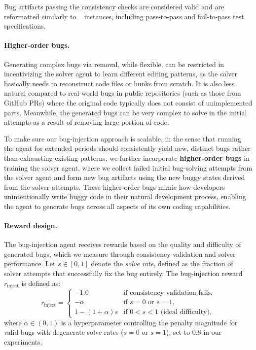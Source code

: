 Bug artifacts passing the consistency checks are considered valid and are reformatted similarly to \swebench~\cite{swebench} instances, including pass-to-pass and fail-to-pass test specifications.

\paragraph{Higher-order bugs.}
Generating complex bugs via removal, while flexible, can be restricted in incentivizing the solver agent to learn different editing patterns, as the solver basically needs to reconstruct code files or hunks from scratch.
It is also less natural compared to real-world bugs in public repositories (such as those from GitHub PRs) where the original code typically does not consist of unimplemented parts.
Meanwhile, the generated bugs can be very complex to solve in the initial attempts as a result of removing large portion of code.

To make sure our bug-injection approach is scalable, in the sense that running the agent for extended periods should consistently yield new, distinct bugs rather than exhausting existing patterns, we further incorporate \textbf{higher-order bugs} in training the solver agent, where we collect failed initial bug-solving attempts from the solver agent and form new bug artifacts using the new buggy states derived from the solver attempts.
These higher-order bugs mimic how developers unintentionally write buggy code in their natural development process, enabling the agent to generate bugs across all aspects of its own coding capabilities.

\paragraph{Reward design.}
The bug-injection agent receives rewards based on the quality and difficulty of generated bugs, which we measure through consistency validation and solver performance. Let $s \in [0, 1]$ denote the \textit{solve rate}, defined as the fraction of solver attempts that successfully fix the bug entirely.
The bug-injection reward $r_{\text{inject}}$ is defined as:
\begin{equation}
\label{eq:reward_inject}
r_{\text{inject}} = \begin{cases}
-1.0 & \text{if consistency validation fails},\\
-\alpha & \text{if }s = 0\text{ or }s = 1, \\
1 - (1 + \alpha)s & \text{if } 0 < s < 1 \text{ (ideal difficulty)},
\end{cases}
\end{equation}
where $\alpha \in (0, 1)$ is a hyperparameter controlling the penalty magnitude for valid bugs with degenerate solve rates ($s = 0$ or $s = 1$), set to $0.8$ in our experiments. 

